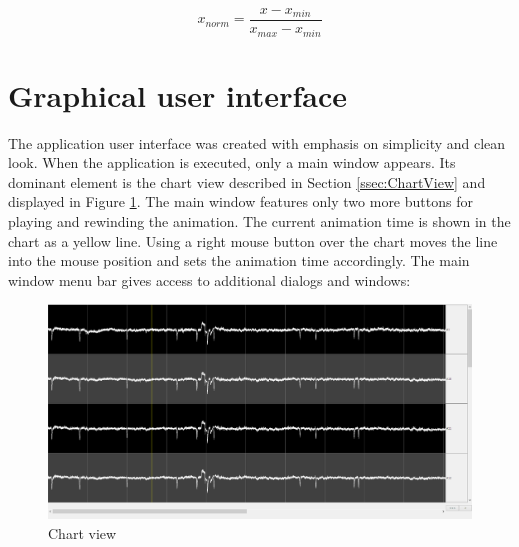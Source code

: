 \begin{equation}
\label{eq:xNorm}
x_{norm} = \frac{x - x_{min}}{x_{max} - x_{min}}
\end{equation}

\section{Graphical user interface}
\label{sec:GUI}
The application user interface was created with emphasis on simplicity and clean look. When the application is executed, only a main window appears. Its dominant element is the chart view described in Section \ref{ssec:ChartView} and displayed in Figure \ref{fig:chartView}. The main window features only two more buttons for playing and rewinding the animation. The current animation time is shown in the chart as a yellow line. Using a right mouse button over the chart moves the line into the mouse position and sets the animation time accordingly. The main window menu bar gives access to additional dialogs and windows:

\begin{figure}[htb]
	\centering
	\includegraphics[width=1\linewidth]{fig/chartView.png}
	\caption{Chart view}
	\label{fig:chartView}
\end{figure}

